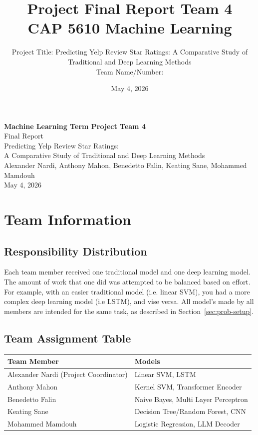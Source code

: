 \documentclass[12pt]{article}
\title{Project Final Report Team 4\\[0.5em]\large CAP 5610 Machine Learning}
\author{
    Project Title: Predicting Yelp Review Star Ratings: A Comparative Study of Traditional and Deep Learning Methods\\
    Team Name/Number: \underline{\hspace{3in}}
}
\date{May 4, 2026}
\begin{document}
\sloppy

\begin{center}
    {\LARGE \textbf{Machine Learning Term Project Team 4}} \\[0.5em]
    {\Large Final Report} \\[1em]
    {\large Predicting Yelp Review Star Ratings: \\
    A Comparative Study of Traditional and Deep Learning Methods} \\[1em]
    Alexander Nardi, Anthony Mahon, Benedetto Falin, Keating Sane, Mohammed Mamdouh \\[0.4em]
    May 4, 2026
\end{center}

\setcounter{tocdepth}{2}
\tableofcontents
\newpage

\section{Team Information}

\subsection{Responsibility Distribution}

Each team member received one traditional model and one deep learning model. The amount of work that one did was attempted to be balanced based on effort. For example, with an easier traditional model (i.e. linear SVM), you had a more complex deep learning model (i.e LSTM), and vise versa.\newline\newline
All model's made by all members are intended for the same task, as described in Section~\ref{sec:prob-setup}.

\subsection{Team Assignment Table}
\begin{table}[H]
    \centering
    \begin{tabularx}{\textwidth}{p{} Y}
        \toprule
        \textbf{Team Member}                  & \textbf{Models}                     \\
        \midrule
        Alexander Nardi (Project Coordinator) & Linear SVM, LSTM                    \\
        Anthony Mahon                         & Kernel SVM, Transformer Encoder     \\
        Benedetto Falin                       & Naive Bayes, Multi Layer Perceptron \\
        Keating Sane                          & Decision Tree/Random Forest, CNN    \\
        Mohammed Mamdouh                      & Logistic Regression, LLM Decoder    \\
        \bottomrule
    \end{tabularx}
\end{table}
\end{document}
